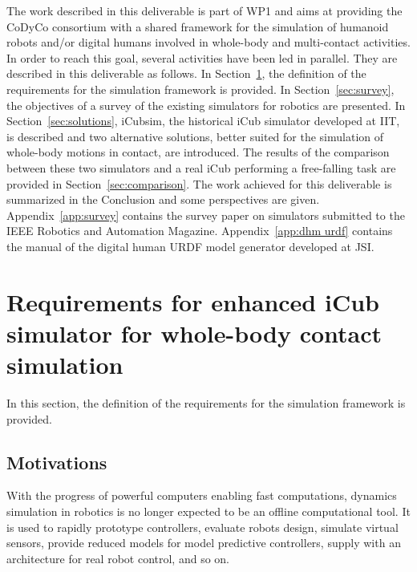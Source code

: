 \documentclass[12pt,a4paper,twoside]{article}
\begin{document}
The work described in this deliverable is part of WP1 and aims at providing the CoDyCo consortium with a shared framework for the simulation of humanoid robots and/or digital humans involved in whole-body and multi-contact activities. In order to reach this goal, several activities have been led in parallel. They are described in this deliverable as follows. In Section~\ref{sec:requirements}, the definition of the requirements for the simulation framework is provided. In Section~\ref{sec:survey}, the objectives of a survey of the existing simulators for robotics are presented. In Section~\ref{sec:solutions}, iCubsim, the historical iCub simulator developed at IIT, is described and two alternative solutions, better suited for the simulation of whole-body motions in contact, are introduced. The results of the comparison  between these two simulators and a real iCub performing a free-falling task are provided in Section~\ref{sec:comparison}. The work achieved for this deliverable is summarized in the Conclusion and some perspectives are given. Appendix~\ref{app:survey} contains the survey paper on simulators submitted to the IEEE Robotics and Automation Magazine. Appendix~\ref{app:dhm urdf} contains the manual of the digital human URDF model generator developed at JSI.


\section{Requirements for enhanced iCub simulator for whole-body contact simulation }
\label{sec:requirements}

In this section, the definition of the requirements for the simulation framework is provided.

\subsection{Motivations}

With the progress of powerful computers enabling fast computations, dynamics simulation in robotics is no longer expected to be an offline computational tool. It is used to rapidly prototype controllers, evaluate robots design, simulate virtual sensors, provide reduced models for model predictive controllers, supply with an architecture for real robot control, and so on.\\
\end{document}
